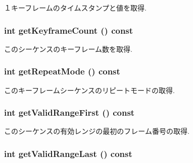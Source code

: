 １キーフレームのタイムスタンプと値を取得. \hypertarget{classm3g_1_1KeyframeSequence_4d500a603f25adafd8e6f8b68872dbff}{
\subsubsection[{getKeyframeCount}]{\setlength{\rightskip}{0pt plus 5cm}int getKeyframeCount () const}}
\label{classm3g_1_1KeyframeSequence_4d500a603f25adafd8e6f8b68872dbff}


このシーケンスのキーフレーム数を取得. \hypertarget{classm3g_1_1KeyframeSequence_a356af60b9759d5d3da833773e3c7b73}{
\subsubsection[{getRepeatMode}]{\setlength{\rightskip}{0pt plus 5cm}int getRepeatMode () const}}
\label{classm3g_1_1KeyframeSequence_a356af60b9759d5d3da833773e3c7b73}


このキーフレームシーケンスのリピートモードの取得. \hypertarget{classm3g_1_1KeyframeSequence_b7e54386674cefdb8f5fa65ce5435b50}{
\subsubsection[{getValidRangeFirst}]{\setlength{\rightskip}{0pt plus 5cm}int getValidRangeFirst () const}}
\label{classm3g_1_1KeyframeSequence_b7e54386674cefdb8f5fa65ce5435b50}


このシーケンスの有効レンジの最初のフレーム番号の取得. \hypertarget{classm3g_1_1KeyframeSequence_aa98cc8d698c482c33a3487c33db27d0}{
\subsubsection[{getValidRangeLast}]{\setlength{\rightskip}{0pt plus 5cm}int getValidRangeLast () const}}
\label{classm3g_1_1KeyframeSequence_aa98cc8d698c482c33a3487c33db27d0}


